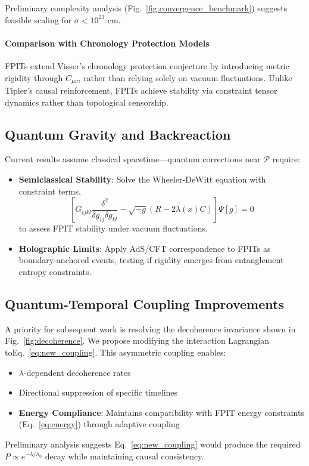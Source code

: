 \documentclass[twocolumn]{article}
\newcommand{\fpit}{\mathcal{P}}
\newcommand{\lagrange}{\lambda(x)}
\begin{document}
	Preliminary complexity analysis (Fig.~\ref{fig:convergence_benchmark}) suggests feasible scaling for $\sigma < 10^{23}$ cm.
	
	\paragraph{Comparison with Chronology Protection Models}
	FPITs extend Visser's chronology protection conjecture\cite{visser1996} by introducing metric rigidity through $C_{\mu\nu}$, rather than relying solely on vacuum fluctuations. Unlike Tipler's causal reinforcement\cite{tipler1977}, FPITs achieve stability via constraint tensor dynamics rather than topological censorship.  
	
	\subsection{Quantum Gravity and Backreaction}
	Current results assume classical spacetime—quantum corrections near \(\fpit\) require:  
	\begin{itemize}
		\item \textbf{Semiclassical Stability}: Solve the Wheeler-DeWitt equation with constraint terms, 
		\begin{equation}
			\left[ G_{ijkl} \frac{\delta^2}{\delta g_{ij} \delta g_{kl}} - \sqrt{-g}(R - 2\lagrange C) \right] \Psi[g] = 0
		\end{equation}
		to assess FPIT stability under vacuum fluctuations\cite{kiefer2012}.
		\item \textbf{Holographic Limits}: Apply AdS/CFT correspondence\cite{maldacena1998} to FPITs as boundary-anchored events, testing if rigidity emerges from entanglement entropy constraints\cite{almheiri2020}.
	\end{itemize}
	
	\subsection{Quantum-Temporal Coupling Improvements}\label{subsec:future_coupling}
	
	A priority for subsequent work is resolving the decoherence invariance shown in Fig.~\ref{fig:decoherence}. We propose modifying the interaction Lagrangian toEq.~\eqref{eq:new_coupling}. This asymmetric coupling enables:
	\begin{itemize}
		\item $\lambda$-dependent decoherence rates
		\item Directional suppression of specific timelines
		\item \textbf{Energy Compliance}: Maintains compatibility with FPIT energy constraints (Eq.~\ref{eq:energy}) through adaptive coupling
	\end{itemize}
	Preliminary analysis suggests Eq.~\eqref{eq:new_coupling} would produce the required $P \propto e^{-\lambda/\lambda_0}$ decay while maintaining causal consistency.
	
\end{document}
